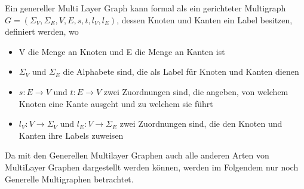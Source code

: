 Ein genereller Multi Layer Graph kann formal als ein gerichteter Multigraph\cite{multiLayerMath} $G = (\Sigma_{V}, \Sigma_{E}, V, E, s, t, l_{V}, l_{E})$, dessen Knoten und Kanten ein Label besitzen, definiert werden, wo

\begin{itemize}
  \item V die Menge an Knoten und E die Menge an Kanten ist
  \item $\Sigma_{V}$ und $\Sigma_{E}$ die Alphabete sind, die als Label für Knoten und Kanten dienen
  \item $s: E \rightarrow V$ und $t: E \rightarrow V$ zwei Zuordnungen sind, die angeben, von welchem Knoten eine Kante ausgeht und zu welchem sie führt
  \item $l_{V}: V \rightarrow \Sigma_{V}$ und $l_{E}: V \rightarrow \Sigma_{E}$ zwei Zuordnungen sind, die den Knoten und Kanten ihre Labels zuweisen
\end{itemize}

Da mit den Generellen Multilayer Graphen auch alle anderen Arten von MultiLayer Graphen dargestellt werden können, werden im Folgendem nur noch Generelle Multigraphen betrachtet.
